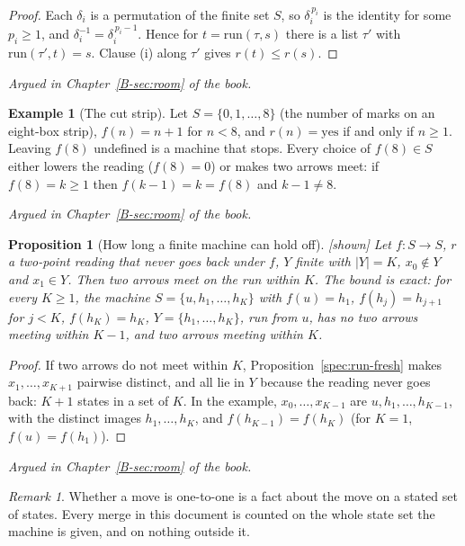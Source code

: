 \documentclass[11pt, a4paper]{article}
\theoremstyle{plain}
\newtheorem{proposition}[theorem]{Proposition}
\theoremstyle{definition}
\newtheorem{example}[theorem]{Example}
\theoremstyle{remark}
\newtheorem{remark}[theorem]{Remark}
\newcommand{\step}{\delta}
\newcommand{\rd}{r}
\newcommand{\run}{\mathrm{run}}
\newcommand{\argued}[1]{\par\noindent\textit{Argued in Chapter~\ref{B-#1} of the book.}\par}
\newcommand{\kind}[1]{\textup{[#1]}}
\begin{document}
\begin{proof}
Each $\step_i$ is a permutation of the finite set $S$, so $\step_i^{\,p_i}$ is the identity for some
$p_i\ge1$, and $\step_i^{-1}=\step_i^{\,p_i-1}$. Hence for $t=\run(\tau,s)$ there is a list $\tau'$ with
$\run(\tau',t)=s$. Clause (i) along $\tau'$ gives $\rd(t)\le\rd(s)$.
\end{proof}

\argued{sec:room}

\begin{example}[The cut strip]\label{spec:cut-strip}
Let $S=\{0,1,\dots,8\}$ (the number of marks on an eight-box strip), $f(n)=n+1$ for $n<8$, and
$\rd(n)=\mathrm{yes}$ if and only if $n\ge1$. Leaving $f(8)$ undefined is a machine that stops. Every
choice of $f(8)\in S$ either lowers the reading ($f(8)=0$) or makes two arrows meet: if $f(8)=k\ge1$
then $f(k-1)=k=f(8)$ and $k-1\ne8$.
\end{example}

\argued{sec:room}

\begin{proposition}[How long a finite machine can hold off]\label{spec:hold-off} \kind{shown}
Let $f:S\to S$, $\rd$ a two-point reading that never goes back under $f$, $Y$ finite with $|Y|=K$,
$x_0\notin Y$ and $x_1\in Y$. Then two arrows meet on the run within $K$. The bound is exact: for every
$K\ge1$, the machine $S=\{u,h_1,\dots,h_K\}$ with $f(u)=h_1$, $f(h_j)=h_{j+1}$ for $j<K$, $f(h_K)=h_K$,
$Y=\{h_1,\dots,h_K\}$, run from $u$, has no two arrows meeting within $K-1$, and two arrows meeting
within $K$.
\end{proposition}

\begin{proof}
If two arrows do not meet within $K$, Proposition~\ref{spec:run-fresh} makes $x_1,\dots,x_{K+1}$
pairwise distinct, and all lie in $Y$ because the reading never goes back: $K+1$ states in a set of
$K$. In the example, $x_0,\dots,x_{K-1}$ are $u,h_1,\dots,h_{K-1}$, with the distinct images
$h_1,\dots,h_K$, and $f(h_{K-1})=f(h_K)$ (for $K=1$, $f(u)=f(h_1)$).
\end{proof}

\argued{sec:room}

\begin{remark}
Whether a move is one-to-one is a fact about the move on a stated set of states. Every merge in this
document is counted on the whole state set the machine is given, and on nothing outside it.
\end{remark}
\end{document}

